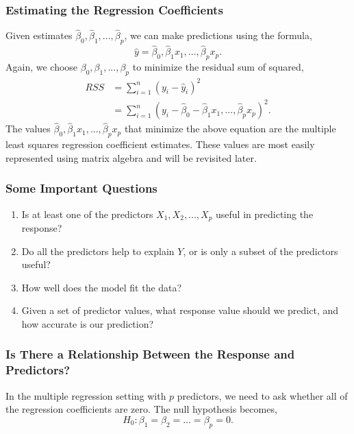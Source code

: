 \documentclass{article}
\numberwithin{equation}{section}
\begin{document}
\subsubsection{Estimating the Regression Coefficients}

Given estimates $\hat \beta_0, \hat \beta_1,..., \hat \beta_p$, we can make predictions using the formula,
\begin{equation}
     \hat y= \hat \beta_0, \hat \beta_1 x_1,..., \hat \beta_p x_p.
\end{equation}
Again, we choose $\beta_0, \beta_1,...,\beta_p$ to minimize the residual sum of squared,
\begin{align*}
    RSS &= \sum_{i=1}^{n} (y_i - \hat y_i)^2 \\
    &=  \sum_{i=1}^{n}(y_i - \hat \beta_0 - \hat \beta_1 x_1,..., \hat \beta_p x_p)^2.
\end{align*}
The values $\hat \beta_0, \hat \beta_1 x_1,..., \hat \beta_p x_p$ that minimize the above equation are the multiple least squares regression coefficient estimates. These values are most easily represented using matrix algebra and will be revisited later.

\subsubsection{Some Important Questions}
\begin{enumerate}
    \item Is at least one of the predictors $X_1, X_2,...,X_p$ useful in predicting the response?
    \item Do all the predictors help to explain $Y$, or is only a subset of the predictors useful?
    \item How well does the model fit the data? 
    \item Given a set of predictor values, what response value should we predict, and how accurate is our prediction?
\end{enumerate}

\subsubsection*{Is There a Relationship Between the Response and Predictors?}
In the multiple regression setting with $p$ predictors, we need to ask whether all of the regression coefficients are zero. The null hypothesis becomes,
\begin{equation}
    H_0 : \beta_1 = \beta_2 = \dots = \beta_p = 0.
\end{equation}
\end{document}
